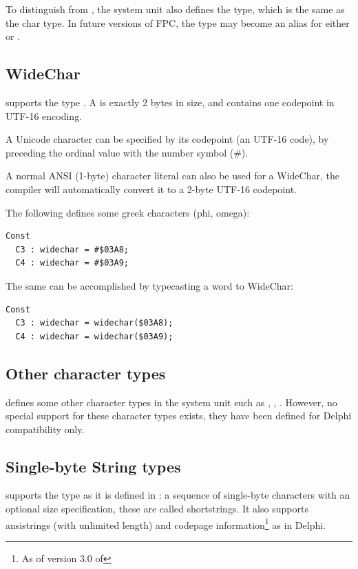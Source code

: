 To distinguish  from , the system unit also defines
the  type, which is the same as the char type. In future
versions of FPC, the  type may become an alias for either 
or .

\subsection{WideChar}
 
\fpc supports the type . A  is exactly 2 bytes in
size, and contains one codepoint in UTF-16 encoding.

A Unicode character can be specified by its codepoint
(an UTF-16 code), by preceding the ordinal value with the number symbol (\#).

A normal ANSI (1-byte) character literal can also be used for a WideChar,
the compiler will automatically convert it to a 2-byte UTF-16 codepoint.

The following defines some greek characters (phi, omega):
\begin{verbatim}
Const
  C3 : widechar = #$03A8;
  C4 : widechar = #$03A9;
\end{verbatim}
The same can be accomplished by typecasting a word to WideChar:
\begin{verbatim}
Const
  C3 : widechar = widechar($03A8);
  C4 : widechar = widechar($03A9);
\end{verbatim}

\subsection{Other character types}
\fpc defines some other character types in the system unit such as
, , .
However, no special support for these character types exists, they have been
defined for Delphi compatibility only.

\subsection{Single-byte String types}
 
\fpc supports the  type as it is defined in \tp: a sequence of single-byte characters with an optional size specification,
these are called shortstrings.
It also supports ansistrings (with unlimited length) and codepage information\footnote{As of version 3.0 of \fpc} as in Delphi.

